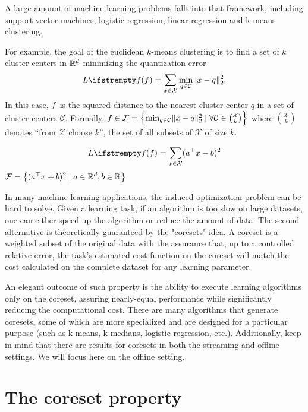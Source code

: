 A large amount of machine learning problems falls into that framework, including support vector machines, logistic regression, linear regression and k-means clustering. 

For example, the goal of the euclidean $k$-means clustering is to find a set of $k$ cluster centers in $\mathbb{R}^d$ minimizing the quantization error
\begin{equation*}
\loss{\query} = \sum_{x \in \mathcal{X}} \min_{q \in \mathcal{C} } \lVert x - q \rVert^2_2.
\end{equation*}
In this case, $f$ is the squared distance to the nearest cluster center $q$ in a set of cluster centers $\mathcal{C}$. Formally, 
$f  \in \mathcal{F} = \left\{\min_{q \in \mathcal{C} } \lVert x - q \rVert^2_2 \mid \forall \mathcal{C}  \in \binom{\mathcal{X}}{k}\right\}$
where $\binom{\mathcal{X}}{k}$ denotes ``from $\mathcal{X}$ choose $k$'', the set of all subsets of $\mathcal{X}$ of size $k$.

\begin{equation*}
    \loss{\query} = \sum_{x\in \mathcal{X}} (a\T x -b)^2
\end{equation*}
$\mathcal{F} = \left\{(a^\top x + b)^2 \mid a \in \mathbb{R}^d, b \in \mathbb{R}\right\}$

In many machine learning applications, the induced optimization problem can be hard to solve. Given a learning task, if an algorithm is too slow on large datasets, one can either speed up the algorithm or reduce the amount of data.
The second alternative is theoretically guaranteed by the "coresets" idea.
A coreset is a weighted subset of the original data with the assurance that, up to a controlled relative error, the task's estimated cost function on the coreset will match the cost calculated on the complete dataset for any learning parameter.

An elegant outcome of such property is the ability to execute learning algorithms only on the coreset, assuring nearly-equal performance while significantly reducing the computational cost. There are many algorithms that generate coresets, some of which are more specialized and are designed for a particular purpose (such as k-means, k-medians, logistic regression, etc.). Additionally, keep in mind that there are results for coresets in both the streaming and offline settings. We will focus here on the offline setting.


\section{The coreset property}

